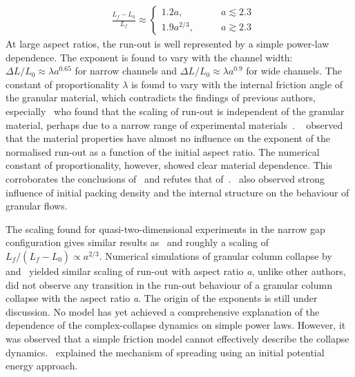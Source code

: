 \begin{align}
& \frac{\textit{L}_{\textit{f}}- 
\textit{L}_{\textit{0}}}{\textit{L}_{\textit{f}}} \approx
\begin{cases} 
1.2\textit{a}, \qquad &\textit{a} \lesssim 2.3 \\
1.9\textit{a}^{2/3}, \qquad &\textit{a} \gtrsim 2.3
\end{cases}
\end{align} 
At large aspect ratios, the run-out is well represented by a simple power-law 
dependence. The exponent is found to vary with the channel width: $\Delta 
\textit{L}/\textit{L}_{\textit{0}} \approx \lambda \textit{a}^{0.65}$ for 
narrow channels and $\Delta \textit{L}/\textit{L}_{\textit{0}} \approx \lambda 
\textit{a}^{0.9}$ for wide channels. The constant of proportionality $\lambda$ 
is found to vary with the internal friction angle of the granular material, 
which contradicts the findings of previous authors, especially~\citet{Lube2005} 
who found that the scaling of run-out is independent of the granular material, 
perhaps due to a narrow range of experimental materials~\citep{Staron2005}.
~\citet{Balmforth2005} observed that the material properties have almost no 
influence on the exponent of the normalised run-out as a function of the 
initial aspect ratio. The numerical constant of proportionality, however, 
showed clear material dependence. This corroborates the conclusions 
of~\citet{Lajeunesse2004} and refutes that 
of~\citet{Lube2005}.~\citet{Daerr1999} also observed strong influence of 
initial packing density and the internal structure on the behaviour of 
granular flows. 


The scaling found for quasi-two-dimensional experiments in the narrow gap 
configuration gives similar results as~\citet{Lube2005} and roughly a scaling 
of $\textit{L}_{\textit{f}}/({\textit{L}_{\textit{f}} - 
\textit{L}_{\textit{0}}}) \propto \textit{a}^{2/3}$. Numerical simulations of 
granular column collapse by~\citet{Zenit2005} and~\citet{Staron2005} yielded 
similar scaling of run-out with aspect ratio \textit{a}, unlike other 
authors,~\citet{Zenit2005} did not observe any transition in the run-out 
behaviour of a granular column collapse with the aspect ratio \textit{a}. The 
origin of the exponents is still under discussion. No model has yet achieved a 
comprehensive explanation of the dependence of the complex-collapse dynamics on 
simple power laws. However, it was observed that a simple friction model cannot 
effectively describe the collapse dynamics.~\citet{Staron2005} explained the 
mechanism of spreading using an initial potential energy approach. 

